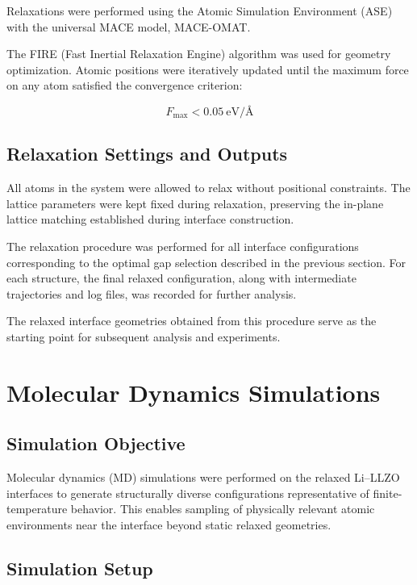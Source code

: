 \documentclass[12pt,a4paper,oneside]{book}
\begin{document}
Relaxations were performed using the Atomic Simulation Environment (ASE) with
the universal MACE model, MACE-OMAT.

The FIRE (Fast Inertial Relaxation Engine) algorithm was used for geometry
optimization. Atomic positions were iteratively updated until the maximum force
on any atom satisfied the convergence criterion:

\begin{equation}
F_{\max} < 0.05 \ \text{eV/\AA}
\end{equation}

\subsection{Relaxation Settings and Outputs}

All atoms in the system were allowed to relax without positional constraints.
The lattice parameters were kept fixed during relaxation, preserving the
in-plane lattice matching established during interface construction.

The relaxation procedure was performed for all interface configurations
corresponding to the optimal gap selection described in the previous section.
For each structure, the final relaxed configuration, along with intermediate
trajectories and log files, was recorded for further analysis.

The relaxed interface geometries obtained from this procedure serve as the
starting point for subsequent analysis and experiments.

\section{Molecular Dynamics Simulations}

\subsection{Simulation Objective}

Molecular dynamics (MD) simulations were performed on the relaxed Li--LLZO
interfaces to generate structurally diverse configurations representative of
finite-temperature behavior. This enables sampling of physically relevant
atomic environments near the interface beyond static relaxed geometries.

\subsection{Simulation Setup}
\label{sec:md_sims}
\end{document}

